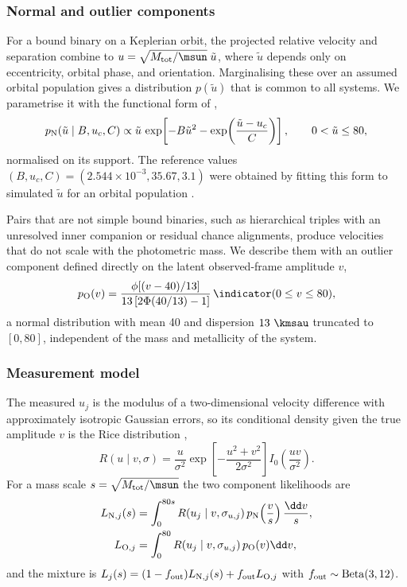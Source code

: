 \subsubsection{Normal and outlier components}

For a bound binary on a Keplerian orbit, the projected relative velocity and
separation combine to
$u=\sqrt{M_{\rm tot}/\msun}\;\tilde u$, where $\tilde u$ depends only on
eccentricity, orbital phase, and orientation.  Marginalising these over an
assumed orbital population gives a distribution $p(\tilde u)$ that is common
to all systems.  We parametrise it with the functional form of
\citet{Hwang2024DynamicalMasses},
\begin{equation}
 p_{\rm N}(\tilde u\mid B,u_c,C)\propto\tilde u\,
 \exp\!\left[-B\tilde u^2-\exp\!\left(\frac{\tilde u-u_c}{C}\right)\right],
 \qquad 0<\tilde u\le80,
 \label{eq:good}
\end{equation}
normalised on its support.  The reference values
$(B,u_c,C)=(2.544\times10^{-3},35.67,3.1)$ were obtained by fitting this form
to simulated $\tilde u$ for an orbital population
.

Pairs that are not simple bound binaries, such as hierarchical triples with an
unresolved inner companion or residual chance alignments, produce velocities
that do not scale with the photometric mass.  We describe them with an outlier
component defined directly on the latent observed-frame amplitude $v$,
\begin{equation}
 p_{\rm O}(v)=\frac{\phi[(v-40)/13]}
 {13\,[2\Phi(40/13)-1]}\,
 \indicator(0\le v\le80),
 \label{eq:out}
\end{equation}
a normal distribution with mean 40 and dispersion $13~\kmsau$ truncated to
$[0,80]$, independent of the mass and metallicity of the system.

\subsubsection{Measurement model}

The measured $u_j$ is the modulus of a two-dimensional velocity difference
with approximately isotropic Gaussian errors, so its conditional density
given the true amplitude $v$ is the Rice distribution \citep{Rice1945},
\begin{equation}
 R(u\mid v,\sigma)=\frac{u}{\sigma^2}
 \exp\!\left[-\frac{u^2+v^2}{2\sigma^2}\right]
 I_0\!\left(\frac{uv}{\sigma^2}\right).
 \label{eq:rice}
\end{equation}
For a mass scale $s=\sqrt{M_{\rm tot}/\msun}$ the two component likelihoods
are
\begin{align}
 L_{{\rm N},j}(s)&=\int_0^{80s}R(u_j\mid v,\sigma_{u,j})\,
 p_{\rm N}\!\left(\frac{v}{s}\right)\frac{\dd v}{s},
 \label{eq:LN}\\
 L_{{\rm O},j}&=\int_0^{80}R(u_j\mid v,\sigma_{u,j})\,p_{\rm O}(v)\dd v,
 \label{eq:LO}
\end{align}
and the mixture is
$L_j(s)=(1-f_{\rm out})L_{{\rm N},j}(s)+f_{\rm out}L_{{\rm O},j}$ with
$f_{\rm out}\sim{\rm Beta}(3,12)$.


